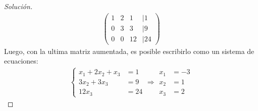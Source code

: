 \documentclass[12pt]{book}
\newenvironment{solucion}
  {\renewcommand\qedsymbol{$\square$}\begin{proof}[Solución]}
  {\end{proof}}
\begin{document}
\begin{solucion}
\begin{align*}
\begin{pmatrix}
    1 & 2 & 1 & | 1  \\
    0 & 3 & 3 & | 9  \\
    0 & 0 & 12 & | 24 
    \end{pmatrix}    
\end{align*}
Luego, con la ultima matriz aumentada, es posible escribirlo como un sistema de ecuaciones:
\begin{align*}
    \begin{cases}
    x_1 + 2 x_2 + x_ 3&=1\\
        3x_2+3x_3&=9\\
        12x_3&=24
    \end{cases}\Rightarrow \begin{matrix}
        x_1&=-3\\
        x_2&=1\\
        x_3&=2
    \end{matrix}
\end{align*}
\end{solucion}
\end{document}
